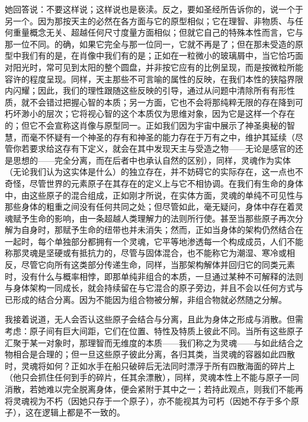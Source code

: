 她回答说：不要这样说；这样说也是亵渎。反之，要如圣经所告诉你的，说一个于另一个。因为那按天主的必然在各方面与它的原型相似；它在理智、非物质、与任何重量概念无关、超越任何尺寸度量方面相似；但就它自己的特殊本性而言，它与那一位不同。的确，如果它完全与那一位同一，它就不再是了；但在那未受造的原型中我们有的是，在肖像中我们有的是；正如在一粒微小的玻璃屑中，当它恰巧面对阳光时，常可见到太阳的整个圆盘，并非按它应有的比例呈现，而是按微粒所能容许的程度呈现。同样，天主那些不可言喻的属性的反映，在我们本性的狭隘界限内闪耀；因此，我们的理性跟随这些反映的引导，通过从问题中清除所有有形性质，就不会错过把握心智的本质；另一方面，它也不会将那纯粹无限的存在降到可朽坏渺小的层次；它将视心智的这个本质仅为思维对象，因为它是这样一个存在的；但它不会宣称这肖像与原型同一。正如我们因为宇宙中展示了神圣奥秘的智慧，而毫不怀疑有一个神圣的存有和神圣的能力存在于万有之中，维护其延续（尽管你若要求给这存有下定义，就会在其中发现天主与受造之物——无论是感官的还是思想的——完全分离，而在后者中也承认自然的区别），同样，灵魂作为实体（无论我们认为这实体是什么）的独立存在，并不妨碍它的实际存在，这一点也不奇怪，尽管世界的元素原子在其存在的定义上与它不相协调。在我们有生命的身体中，由这些原子的混合组成，正如刚才所说，在实体方面，灵魂的单纯不可见性与那些身体的粗重之间没有任何共同之处；但尽管如此，毫无疑问，身体中存在着灵魂赋予生命的影响，由一条超越人类理解力的法则所行使。甚至当那些原子再次分解为自身时，那赋予生命的纽带也并未消失；然而，正如当身体的架构仍然结合在一起时，每个单独部分都拥有一个灵魂，它平等地渗透每一个构成成员，人们不能称那灵魂是坚硬或有抵抗力的，尽管与固体混合，也不能称它为潮湿、寒冷或相反，尽管它向所有这类部分传递生命，同样，当那架构解体并回归它的同类元素时，没有什么与概率相悖，即那单纯非组合的本质，一旦通过某种不可解释的法则与身体架构一同成长，就会持续留在与它混合的原子旁边，并且不会以任何方式与已形成的结合分离。因为不能因为组合物被分解，非组合物就必然随之分解。\par

我接着说道，无人会否认这些原子会结合与分离，且此为身体之形成与消散。但需考虑：原子间有巨大间距，它们在位置、特性及特质上彼此不同。当所有这些原子汇聚于某一对象时，那理智而无维度的本质——我们称之为灵魂——与如此结合之物相合是合理的；但一旦这些原子彼此分离，各归其类，当灵魂的容器如此四散时，灵魂将如何？正如水手在船只破碎后无法同时漂浮于所有四散海面的碎片上（他只会抓住任何到手的碎片，任其余漂散），同样，灵魂本性上不能与原子一同消散，若她难以完全脱离身体，便会紧附于其中之一；若持此观点，则我们不能再将灵魂视为不朽（因她只存于一个原子），亦不能视其为可朽（因她不存于多个原子），这在逻辑上都是不一致的。\par

